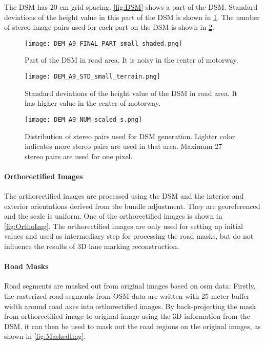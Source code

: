 The DSM has 20 cm grid spacing. \cref{fig:DSM} shows a part of the DSM. Standard deviations of the height value in this part of the DSM is shown in \cref{fig:DSMstd}. The number of stereo image pairs used for each part on the DSM is shown in \cref{fig:DSMnumber}.
\begin{figure}%
  \centering
  \texttt{[image: DEM\_A9\_FINAL\_PART\_small\_shaded.png]}
  \caption{\small Part of the DSM in road area. It is noisy in the center of motorway.}
  \label{fig:DSM}
  \vspace{1cm}
  \texttt{[image: DEM\_A9\_STD\_small\_terrain.png]}
  \caption{\small Standard deviations of the height value of the DSM in road area. It has higher value in the center of motorway.}
  \label{fig:DSMstd}

\end{figure}

\begin{figure}%
  \centering
  \texttt{[image: DEM\_A9\_NUM\_scaled\_s.png]}
  \caption{\small Distribution of stereo pairs used for DSM generation. Lighter color indicates more stereo pairs are used in that area. Maximum 27 stereo pairs are used for one pixel.}%
  \label{fig:DSMnumber}
\end{figure}


\paragraph{Orthorectified Images}
The orthorectified images are processed using the DSM and the interior and exterior orientations derived from the bundle adjustment. They are georeferenced and the scale is uniform. One of the orthorectified images is shown in \cref{fig:OrthoImg}. The orthorectified images are only used for setting up initial values and used as intermediary step for processing the road masks, but do not influence the results of 3D lane marking reconstruction.

\paragraph{Road Masks}
Road segments are masked out from original images based on \gls{osm} data: Firstly, the rasterized road segments from OSM data are written with 25 meter buffer width around road axes into orthorectified images. By back-projecting the mask from orthorectified image to original image using the 3D information from the DSM, it can then be used to mask out the road regions on the original images, as shown in \cref{fig:MaskedImg}.

